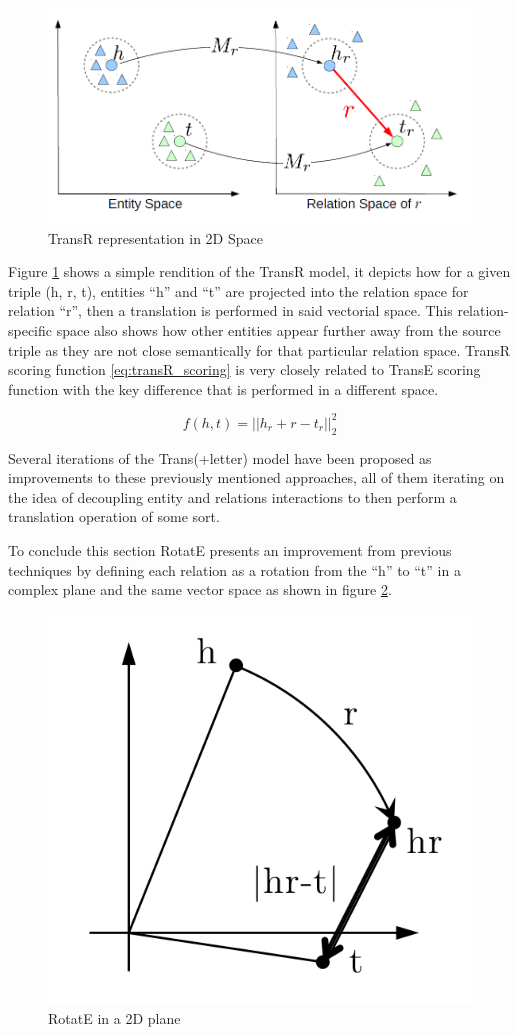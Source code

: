 \begin{figure}[!htp]
    \centering
    \includegraphics[width=.7\textwidth]{fig/embeddings/TransR.png}
    \caption{TransR representation in 2D Space}
    \label{fig:emb-transR}
\end{figure}

Figure \ref{fig:emb-transR} shows a simple rendition of the TransR model, it depicts how for a given triple (h, r, t), entities ``h'' and ``t'' are projected into the relation space for relation ``r'', then a translation is performed in said vectorial space. This relation-specific space also shows how other entities appear further away from the source triple as they are not close semantically for that particular relation space. TransR scoring function \ref{eq:transR_scoring} is very closely related to TransE scoring function with the key difference that is performed in a different space.

\begin{equation}
    \label{eq:transR_scoring}
    f(h, t) = ||h_r + r - t_r||^2_2
\end{equation}

Several iterations of the Trans(+letter) model have been proposed as improvements to these previously mentioned approaches, all of them iterating on the idea of decoupling entity and relations interactions to then perform a translation operation of some sort.

To conclude this section RotatE\cite{} presents an improvement from previous techniques by defining each relation as a rotation from the ``h'' to ``t'' in a complex plane and the same vector space as shown in figure \ref{fig:emb-rotatE}.

\begin{figure}[!htp]
    \centering
    \includegraphics[width=.4\textwidth]{fig/embeddings/RotatE.png}
    \caption{RotatE in a 2D plane}
    \label{fig:emb-rotatE}
\end{figure}

